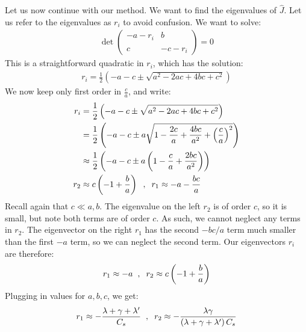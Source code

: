Let us now continue with our method. We want to find the eigenvalues of $\hat{J}$. Let us refer to the eigenvalues as $r_i$ to avoid confusion. We want to solve:
\begin{align*}
    \det\left( \begin{array}{cc}
        -a-r_i & b \\\\
        c & -c-r_i
    \end{array}
    \right)=0
\end{align*}
This is a straightforward quadratic in $r_i$, which has the solution:
\begin{align*}
    r_i=\frac{1}{2}\left( -a-c \pm \sqrt{a^2-2ac+4bc+c^2} \right)
\end{align*}
We now keep only first order in $\frac{c}{a}$, and write:
\begin{align*}
    r_i&=\frac{1}{2}\left( -a-c \pm \sqrt{a^2-2ac+4bc+c^2} \right)\\
    &= \frac{1}{2}\left( 
        -a-c \pm a\sqrt{1-\frac{2c}{a}+\frac{4bc}{a^2}+\left( \frac{c}{a} \right)^2}
     \right) \\ 
    &\approx \frac{1}{2}\left( 
        -a-c \pm a\left(1-\frac{c}{a}+\frac{2bc}{a^2}\right)
     \right) \\ 
    r_2&\approx c\left( -1+\frac{b}{a} \right)\hspace{2mm},\hspace{2mm}r_1\approx -a-\frac{bc}{a}
\end{align*}
Recall again that $c\ll a,b$. The eigenvalue on the left $r_2$ is of order $c$, so it is small, but note both terms are of order $c$. As such, we cannot neglect any terms in $r_2$. The eigenvector on the right $r_1$ has the second $-bc/a$ term much smaller than the first $-a$ term, so we can neglect the second term. Our eigenvectors $r_i$ are therefore:
\begin{align*}
    r_1\approx-a\hspace{2mm},\hspace{2mm} r_2\approx c\left(-1 +\frac{b}{a}\right)
\end{align*}
Plugging in values for $a,b,c$, we get:
\begin{align*}
    r_1\approx-\frac{\lambda+\gamma+\lambda'}{C_s}\hspace{2mm},\hspace{2mm}
    r_2\approx-\frac{\lambda\gamma}{\left( \lambda+\gamma+\lambda' \right)C_s}
\end{align*}

